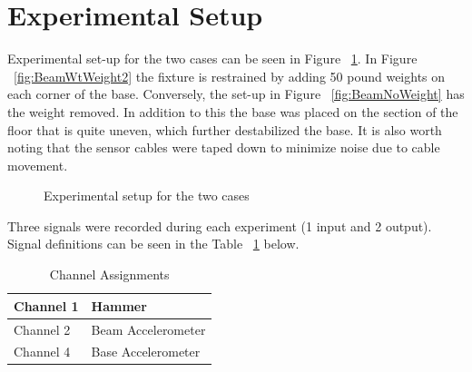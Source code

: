 \documentclass[paper=a4, fontsize=12pt]{scrartcl} %
\begin{document}
\section*{Experimental Setup}
Experimental set-up for the two cases can be seen in Figure ~\ref{fig:test}. In Figure ~\ref{fig:BeamWtWeight2} the fixture is restrained by adding 50 pound weights on each corner of the base. Conversely, the set-up in Figure ~\ref{fig:BeamNoWeight} has the weight removed. In addition to this the base was placed on the section of the floor that is quite uneven, which further destabilized the base. It is also worth noting that the sensor cables were taped down to minimize noise due to cable movement.
%
	\begin{figure}[H]
		\centering
		\quad
		\caption{Experimental setup for the two cases}
		\label{fig:test}
	\end{figure}
%
Three signals were recorded during each experiment (1 input and 2 output). Signal definitions can be seen in the Table ~\ref{table:channelAssignments} below.
%
\begin{table}[H]
\centering
\begin{tabular}{ l | l }
	\hline                       
		Channel 1 & Hammer \\
	\hline
		Channel 2 & Beam Accelerometer \\
	\hline
		Channel 4 & Base Accelerometer \\
	\hline  
\end{tabular}
\caption{Channel Assignments}
\label{table:channelAssignments}
\end{table}
\end{document}

